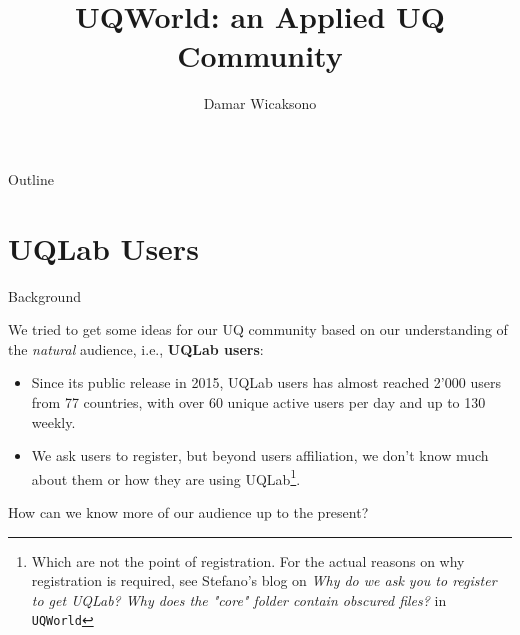 \documentclass[]{rsuqbeamernew}
\title[UQWorld]{UQWorld: an Applied UQ Community}
\author[D. Wicaksono]{Damar Wicaksono}
\institute[RSUQ, ETH Z\"urich]{Chair of Risk, Safety and Uncertainty 
Quantification -- ETH Z\"urich}
\date[09.05.2019]
\begin{document}
\begin{frame}{Outline}

\tableofcontents

\end{frame}

\section{UQLab Users}

\begin{frame}{Background}

We tried to get some ideas for our UQ community based on
our understanding of the \emph{natural} audience, i.e., \textbf{UQLab users}: 

\begin{itemize}
  \item Since its public release in 2015, UQLab users has almost reached 2'000 users from 77 countries,
  with over 60 unique active users per day and up to 130 weekly.
  \item We ask users to register, but beyond users affiliation,
  we don't know much about them or how they are using UQLab\footnote{Which are not the point of registration.
  For the actual reasons on why registration is required,
  see Stefano's blog on \emph{Why do we ask you to register to get UQLab? Why does the "core" folder contain obscured files?}
  in \texttt{UQWorld}}.
\end{itemize}

How can we know more of our audience up to the present?
    
\end{frame}
\end{document}
